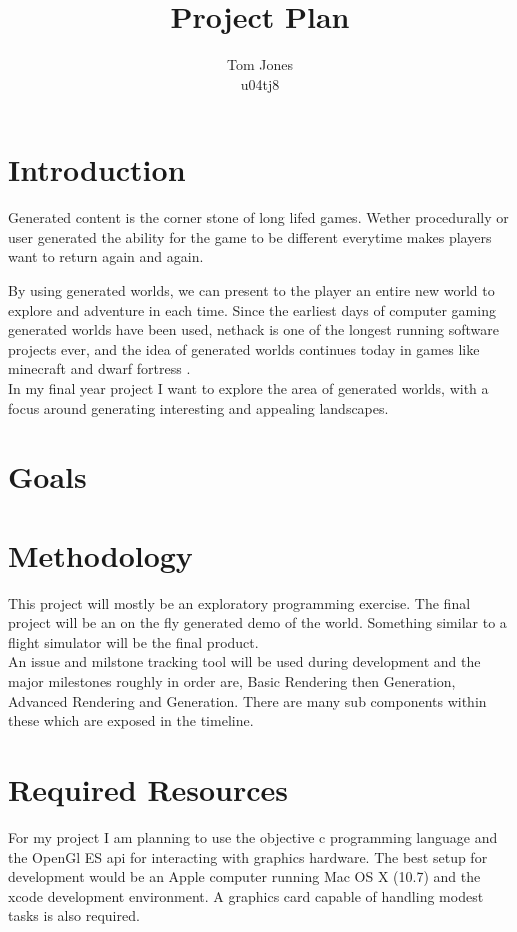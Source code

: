 \documentclass[a4paper,12pt,notitlepage]{article}
\begin{document}
\title{Project Plan}
\author{Tom Jones\\u04tj8}
\maketitle

\section{Introduction}
Generated content is the corner stone of long lifed games. Wether procedurally or
user generated the ability for the game to be different everytime makes players 
want to return again and again.

By using generated worlds, we can present to the player an entire new world to 
explore and adventure in each time. Since the earliest days of computer gaming
generated worlds have been used, nethack \cite{nethack}
is one of the longest running software
projects ever, and the idea of generated worlds continues today in games like 
minecraft \cite{minecraft} and dwarf fortress \cite{dwarffortress}.\\

\noindent
In my final year project I want to explore the area of generated worlds, with a 
focus around generating interesting and appealing landscapes.


\section{Goals}


\section{Methodology}
This project will mostly be an exploratory programming exercise. The final 
project will be an on the fly generated demo of the world. Something similar to
a flight simulator will be the final product.\\

An issue and milstone tracking tool will be used during development and the major
milestones roughly in order are, Basic Rendering then Generation, Advanced 
Rendering and Generation. There are many sub components within these which are
exposed in the timeline.

\section{Required Resources}
For my project I am planning to use the objective c programming language and the
OpenGl ES api for interacting with graphics hardware. The best setup for 
development would be an Apple computer running Mac OS X (10.7) and the xcode 
development environment. A graphics card capable of handling modest tasks is also
required. 
\end{document}
